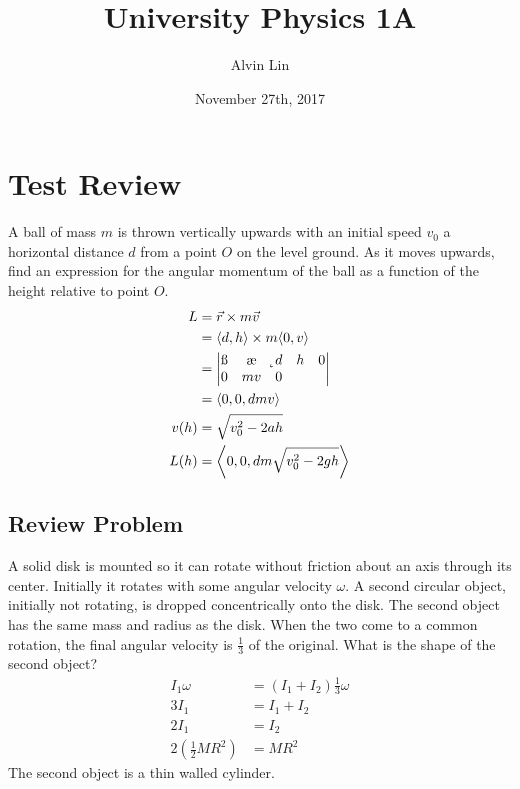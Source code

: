 \documentclass{math}
\title{University Physics 1A}
\author{Alvin Lin}
\date{November 27th, 2017}
\begin{document}
\maketitle

\section*{Test Review}
A ball of mass \( m \) is thrown vertically upwards with an initial speed
\( v_0 \) a horizontal distance \( d \) from a point \( O \) on the level
ground. As it moves upwards, find an expression for the angular momentum of
the ball as a function of the height relative to point \( O \).
\begin{align*}
  L &= \vec{r}\times m\vec{v} \\
  &= \langle d,h\rangle\times m\langle0,v\rangle \\
  &= \begin{vmatrix}
    \i & \j & \k \\
    d & h & 0 \\
    0 & mv & 0
  \end{vmatrix} \\
  &= \langle0,0,dmv\rangle \\
  v(h) &= \sqrt{v_0^2-2ah} \\
  L(h) &= \left\langle0,0,dm\sqrt{v_0^2-2gh}\right\rangle
\end{align*}

\subsection*{Review Problem}
A solid disk is mounted so it can rotate without friction about an axis through
its center. Initially it rotates with some angular velocity \( \omega \). A
second circular object, initially not rotating, is dropped concentrically onto
the disk. The second object has the same mass and radius as the disk. When the
two come to a common rotation, the final angular velocity is \( \frac{1}{3} \)
of the original. What is the shape of the second object?
\begin{align*}
  I_1\omega &= (I_1+I_2)\frac{1}{3}\omega \\
  3I_1 &= I_1+I_2 \\
  2I_1 &= I_2 \\
  2(\frac{1}{2}MR^2) &= MR^2
\end{align*}
The second object is a thin walled cylinder.
\end{document}
